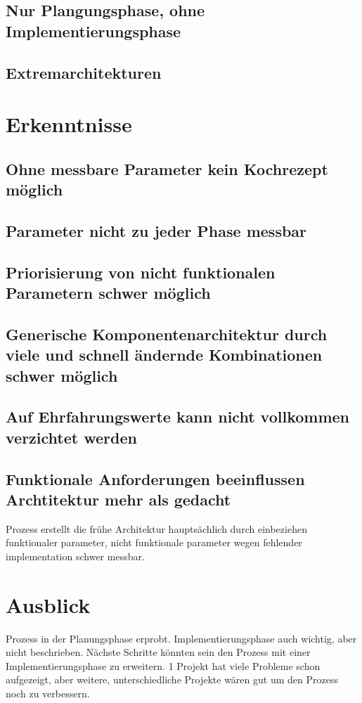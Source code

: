 \documentclass[Master,MSE,german]{twbook}
\begin{document}
\subsection{Nur Plangungsphase, ohne Implementierungsphase}
\subsection{Extremarchitekturen}

\section{Erkenntnisse}
\subsection{Ohne messbare Parameter kein Kochrezept möglich}
\subsection{Parameter nicht zu jeder Phase messbar}
\subsection{Priorisierung von nicht funktionalen Parametern schwer möglich}
\subsection{Generische Komponentenarchitektur durch viele und schnell ändernde Kombinationen schwer möglich}
\subsection{Auf Ehrfahrungswerte kann nicht vollkommen verzichtet werden}
\subsection{Funktionale Anforderungen beeinflussen Archtitektur mehr als gedacht}
Prozess erstellt die frühe Architektur hauptsächlich durch einbeziehen funktionaler parameter, nicht funktionale parameter wegen fehlender implementation schwer messbar.

\section{Ausblick}
Prozess in der Planungsphase erprobt. Implementierungsphase auch wichtig, aber nicht beschrieben. Nächste Schritte könnten sein den Prozess mit einer Implementierungsphase zu erweitern. 1 Projekt hat viele Probleme schon aufgezeigt, aber weitere, unterschiedliche Projekte wären gut um den Prozess noch zu verbessern.
\end{document}
